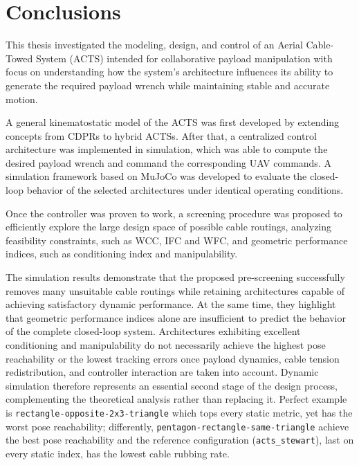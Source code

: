 \chapter{Conclusions}

\label{chap:conclusions}

This thesis investigated the modeling, design, and control of an Aerial Cable-Towed System (ACTS) intended for collaborative payload manipulation with focus on understanding how the system's architecture influences its ability to generate the required payload wrench while maintaining stable and accurate motion.

A general kinematostatic model of the ACTS was first developed by extending concepts from CDPRs to hybrid ACTSs. After that, a centralized control architecture was implemented in simulation, which was able to compute the desired payload wrench and command the corresponding UAV commands. A simulation framework based on MuJoCo was developed to evaluate the closed-loop behavior of the selected architectures under identical operating conditions.

Once the controller was proven to work, a screening procedure was proposed to efficiently explore the large design space of possible cable routings, analyzing feasibility constraints, such as WCC, IFC and WFC, and geometric performance indices, such as conditioning index and manipulability.

The simulation results demonstrate that the proposed pre-screening successfully removes many unsuitable cable routings while retaining architectures capable of achieving satisfactory dynamic performance. At the same time, they highlight that geometric performance indices alone are insufficient to predict the behavior of the complete closed-loop system. Architectures exhibiting excellent conditioning and manipulability do not necessarily achieve the highest pose reachability or the lowest tracking errors once payload dynamics, cable tension redistribution, and controller interaction are taken into account. Dynamic simulation therefore represents an essential second stage of the design process, complementing the theoretical analysis rather than replacing it. Perfect example is \texttt{rectangle-opposite-2x3-triangle} which tops every static metric, yet has the worst pose reachability; differently, \texttt{pentagon-rectangle-same-triangle} achieve the best pose reachability and the reference configuration (\texttt{acts\_stewart}), last on every static index, has the lowest cable rubbing rate.

